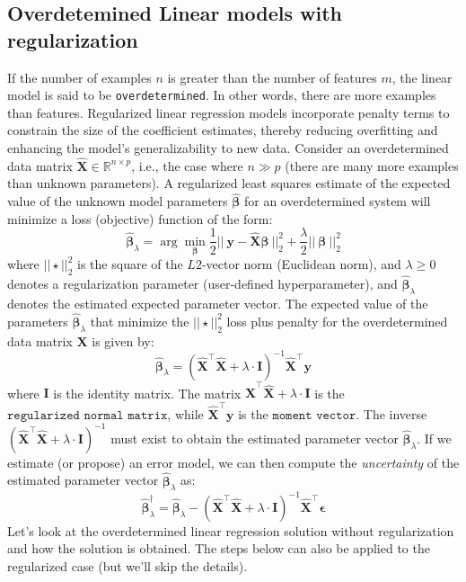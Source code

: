 \documentclass{article}[11pt]
\begin{document}
\subsection{Overdetemined Linear models with regularization}
If the number of examples $n$ is greater than the number of features $m$, the linear model is said to be \texttt{overdetermined}.
In other words, there are more examples than features.  Regularized linear regression models incorporate penalty terms to constrain the size of the coefficient estimates, 
thereby reducing overfitting and enhancing the model's generalizability to new data. 
Consider an overdetermined data matrix $\hat{\mathbf{X}}\in\mathbb{R}^{n\times{p}}$, i.e., the case where $n\gg{p}$ (there are many more examples than unknown parameters).
A regularized least squares estimate of the expected value of the unknown model parameters $\hat{\mathbf{\beta}}$ for an overdetermined system will minimize a loss (objective) function of the form:
\begin{equation}\label{eq:regressionloss-regularization-L2}
\hat{\mathbf{\beta}}_{\lambda} = \arg\min_{\mathbf{\beta}} \frac{1}{2}||~\mathbf{y} - \hat{\mathbf{X}}\mathbf{\beta}~||^{2}_{2} + 
\frac{\lambda}{2}||~\mathbf{\beta}~||^{2}_{2}
\end{equation}
where $||\star||^{2}_{2}$ is the square of the $L2$-vector norm (Euclidean norm), and
$\lambda\geq{0}$ denotes a regularization parameter (user-defined hyperparameter), 
and $\hat{\mathbf{\beta}}_{\lambda}$ denotes the estimated expected parameter vector. 
The expected value of the parameters $\hat{\mathbf{\beta}}_{\lambda}$ that minimize the $||\star||^{2}_{2}$ loss plus penalty for the overdetermined data matrix $\mathbf{X}$ is given by:
\begin{equation*}
\hat{\mathbf{\beta}}_{\lambda} = \left(\hat{\mathbf{X}}^{\top}\hat{\mathbf{X}}+\lambda\cdot\mathbf{I}\right)^{-1}\hat{\mathbf{X}}^{\top}\mathbf{y}
\end{equation*}
where $\mathbf{I}$ is the identity matrix.
The matrix $\hat{\mathbf{X}}^{\top}\hat{\mathbf{X}}+\lambda\cdot\mathbf{I}$ is the $\texttt{regularized normal matrix}$, while $\hat{\mathbf{X}}^{\top}\mathbf{y}$ is the $\texttt{moment vector}$. 
The inverse $\left(\hat{\mathbf{X}}^{\top}\hat{\mathbf{X}}+\lambda\cdot\mathbf{I}\right)^{-1}$ must exist to obtain the estimated parameter vector $\hat{\mathbf{\beta}}_{\lambda}$.
If we estimate (or propose) an error model, we can then compute the \textit{uncertainty} of the estimated parameter vector $\hat{\mathbf{\beta}}_{\lambda}$ as:
\begin{equation*}
\hat{\mathbf{\beta}}^{\dagger}_{\lambda} = \hat{\mathbf{\beta}}_{\lambda} - \left(\hat{\mathbf{X}}^{\top}\hat{\mathbf{X}}+\lambda\cdot\mathbf{I}\right)^{-1}\hat{\mathbf{X}}^{\top}\mathbf{\epsilon}
\end{equation*}
Let's look at the overdetermined linear regression solution without regularization and how the solution is obtained.
The steps below can also be applied to the regularized case (but we'll skip the details).
\end{document}
